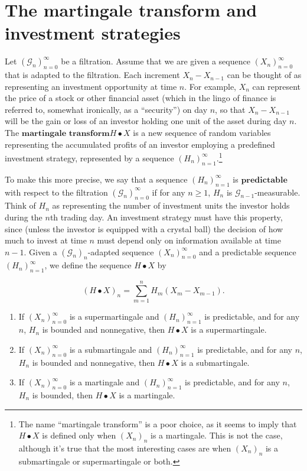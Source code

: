 \section{The martingale transform and investment strategies}
Let $(\mathcal{G}_n)_{n=0}^\infty$ be a filtration.
Assume that we are given a sequence
$(X_n)_{n=0}^\infty$ that is adapted to the
filtration. Each increment $X_n-X_{n-1}$ can be
thought of as representing an investment opportunity
at time $n$. For example, $X_n$ can represent the
price of a stock or other financial asset (which in
the lingo of finance is referred to, somewhat
ironically, as a ``security'') on day $n$, so that
$X_n-X_{n-1}$ will be the gain or loss of an investor
holding one unit of the asset during day $n$. The
$\textbf{martingale transform}$$H\bullet X$ is a new
sequence of random variables representing the
accumulated profits of an investor employing a
predefined investment strategy, represented by a
sequence
$(H_n)_{n=1}^\infty$.\footnote{The name ``martingale transform'' is a poor choice,
as it seems to imply that $H\bullet X$ is defined
only when $(X_n)_n$ is a martingale. This is not the
case, although it's true that the most interesting
cases are when $(X_n)_n$ is a submartingale or
supermartingale or both.}

To make this more precise, we say that a sequence
$(H_n)_{n=1}^\infty$ is $\textbf{predictable}$ with
respect to the filtration
$(\mathcal{G}_n)_{n=0}^\infty$ if for any $n\ge 1$,
$H_n$ is $\mathcal{G}_{n-1}$-measurable. Think of
$H_n$ as representing the number of investment units
the investor holds during the $n$th trading day. An
investment strategy must have this property, since
(unless the investor is equipped with a crystal ball)
the decision of how much to invest at time $n$ must
depend only on information available at time $n-1$.
Given a $(\mathcal{G}_n)_n$-adapted sequence
$(X_n)_{n=0}^\infty$ and a predictable sequence
$(H_n)_{n=1}^\infty$, we define the sequence
$H\bullet X$ by

\[
(H\bullet X)_n = \sum_{m=1}^n H_m(X_m-X_{m-1}).
\]

\begin{thm}
\label{thm-marting-transform}

\begin{enumerate}[label=\arabic*.]
\item If $(X_n)_{n=0}^\infty$ is a supermartingale and
$(H_n)_{n=1}^\infty$ is predictable, and for any $n$,
$H_n$ is bounded and nonnegative, then $H\bullet X$
is a supermartingale.

\item If $(X_n)_{n=0}^\infty$ is a submartingale and
$(H_n)_{n=1}^\infty$ is predictable, and for any $n$,
$H_n$ is bounded and nonnegative, then $H\bullet X$
is a submartingale.

\item If $(X_n)_{n=0}^\infty$ is a martingale and
$(H_n)_{n=1}^\infty$ is predictable, and for any $n$,
$H_n$ is bounded, then $H\bullet X$ is a martingale.
\end{enumerate}

\end{thm}

